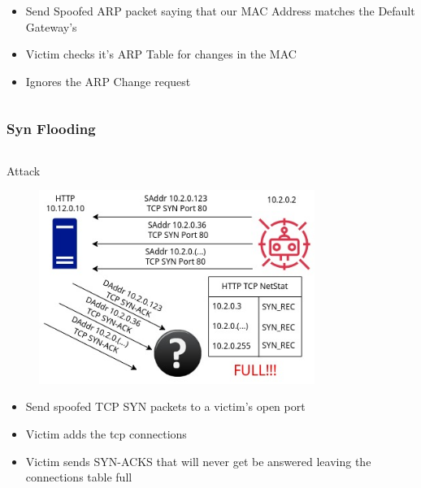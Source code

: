 \documentclass{beamer}
\begin{document}
\begin{frame}
\begin{columns}
\begin{column}{0.5\textwidth}
\begin{figure}
        \end{figure}
            \begin{itemize}[label={}]
                \item \footnotesize Send Spoofed ARP packet saying that our MAC Address matches the Default Gateway's
                \item \footnotesize Victim checks it's ARP Table for changes in the MAC
                \item \footnotesize Ignores the ARP Change request
            \end{itemize}
    \end{column}
\end{columns}
\end{frame}


\begin{frame}
\frametitle{Syn Flooding}
\begin{columns}
    \begin{column}{0.5\textwidth}
        \Large Attack
        \begin{figure}
            \centering
            \includegraphics[width=0.8\textwidth]{flood_attack.jpg}\\
        \end{figure}
            \begin{itemize}[label={}]
                \item \footnotesize Send spoofed TCP SYN packets to a victim's open port
                \item \footnotesize Victim adds the tcp connections
                \item \footnotesize Victim sends SYN-ACKS that will never get be answered leaving the connections table full
            \end{itemize}
    \end{column}

\end{columns}
\end{frame}
\end{document}
